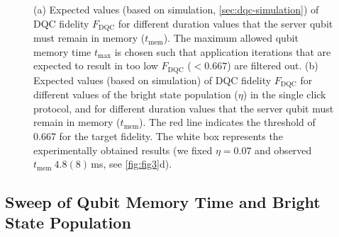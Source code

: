 \begin{figure}[htbp]
    \centering
    \hfill
    \caption{
        (a) Expected values (based on simulation, \cref{sec:dqc-simulation}) of \ac{DQC} fidelity $F_{\text{DQC}}$ for different duration values that the server qubit must remain in memory ($t_{\text{mem}}$). The maximum allowed qubit memory time $t_{\max}$ is chosen such that application iterations that are expected to result in too low $F_{\text{DQC}}$ ($<0.667$) are filtered out.
        (b) Expected values (based on simulation) of \ac{DQC} fidelity $F_{\text{DQC}}$ for different values of the bright state population ($\eta$) in the single click protocol, and for different duration values that the server qubit must remain in memory ($t_{\text{mem}}$). The red line indicates the threshold of 0.667 for the target fidelity. The white box represents the experimentally obtained results (we fixed $\eta = 0.07$ and observed $t_{\text{mem}} ~4.8(8)$\,ms, see \cref{fig:fig3}d).
    }
    \label{fig:delcomp-simulation}
\end{figure}

\subsection{Sweep of Qubit Memory Time and Bright State Population}

